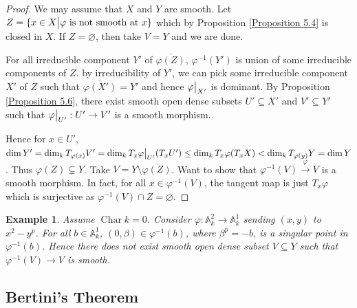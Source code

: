 \documentclass{ctexart}
\newtheorem{example}{Example}[section]
\newcommand{\characteristic}{\operatorname{Char}}
\begin{document}
\begin{proof}
    We may assume that $X$ and $Y$ are smooth.
    Let $Z = \{x\in X \big{|} \varphi \text{ is not smooth at } x\}$ which by Proposition \ref{Proposition 5.4} is closed in $X$.
    If $Z = \varnothing$, then take $V = Y$ and we are done.
    \par
    For all irreducible component $Y'$ of $\overline{\varphi(Z)}$, $\varphi^{-1}(Y')$ is union of some irreducible components of $Z$.
    by irreducibility of $Y'$, we can pick some irreducible component $X'$ of $Z$ such that $\overline{\varphi(X')} = Y'$ and hence $\varphi\big{|}_{X'}$ is dominant.
    By Proposition \ref{Proposition 5.6}, there exist smooth open dense subsets $U' \subseteq X'$ and $V' \subseteq Y'$ such that $\varphi\big{|}_{U'}: U' \rightarrow V'$ is a smooth morphism.
    \par
    Hence for $x\in U'$, $\dim Y' = \dim_{k} T_{\varphi(x)}V' = \dim_{k} T_{x}\varphi\big{|}_{U'}(T_{x}U') \le \dim_{k} T_{x}\varphi(T_{x}X) < \dim_{k} T_{\varphi(y)}Y = \dim Y$.
    Thus $\overline{\varphi(Z)} \subsetneq Y$.
    Take $V = Y \setminus \overline{\varphi(Z)}$.
    Want to show that $\varphi^{-1}(V) \overset{\varphi}{\rightarrow} V$ is a smooth morphism.
    In fact, for all $x\in \varphi^{-1}(V)$, the tangent map is just $T_{x}\varphi$ which is surjective as $\varphi^{-1}(V) \cap Z = \varnothing$.
\end{proof}
\begin{example}
    Assume $\characteristic k = 0$.
    Consider $\varphi: \mathbb{A}_{k}^{2} \rightarrow \mathbb{A}_{k}^{1}$ sending $(x, y)$ to $x^{2} - y^{p}$.
    For all $b\in \mathbb{A}_{k}^{1}$, $(0, \beta)\in \varphi^{-1}(b)$, where $\beta^{p} = -b$,
    is a singular point in $\varphi^{-1}(b)$.
    Hence there does not exist smooth open dense subset $V\subseteq Y$ such that $\varphi^{-1}(V) \rightarrow V$ is smooth.
\end{example}

\subsection{Bertini's Theorem}
\label{subsection:Smooth_Points_and_Smooth_Morphisms_Bertini's_Theorem}
\end{document}
